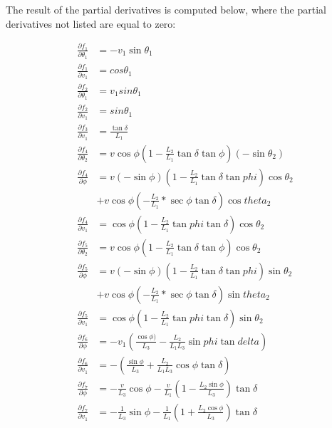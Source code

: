 The result of the partial derivatives is computed below, where the partial derivatives not listed are equal to zero:

\begin{equation}
\begin{aligned} 
    \frac{\partial f_1}{\partial \theta_1} &= -v_1 \sin{\theta_1} \\
    \frac{\partial f_1}{\partial v_1} &= cos\theta_1  \\
    \frac{\partial f_2}{\partial \theta_1} &= v_1 sin\theta_1  \\
    \frac{\partial f_2}{\partial v_1} &= sin\theta_1  \\
    \frac{\partial f_3}{\partial v_1} &= \frac{\tan{\delta}}{L_1}  \\
    \frac{\partial f_4}{\partial \theta_2} &= v\cos\phi(1-\frac{L_2}{L_1}\tan\delta\tan\phi)(-\sin{\theta_2})  \\
    \frac{\partial f_4}{\partial \phi} &= v (-\sin{\phi}) (1-\frac{L_2}{L_1}\tan{\delta}\tan{phi})\cos{\theta_2}\\
            &+v\cos{\phi}(-\frac{L_2}{L_1}*\sec{\phi} \tan{\delta})\cos{theta_2}  \\
    \frac{\partial f_4}{\partial v_1} &= \cos{\phi}(1 - \frac{L_2}{L_1}\tan{phi}\tan{\delta})\cos{\theta_2}  \\
    \frac{\partial f_5}{\partial \theta_2} &= v\cos\phi(1-\frac{L_2}{L_1}\tan\delta\tan\phi)\cos{\theta_2}  \\
    \frac{\partial f_5}{\partial \phi} &= v (-\sin{\phi}) (1-\frac{L_2}{L_1}\tan{\delta}\tan{phi})\sin{\theta_2}\\
            &+v\cos{\phi}(-\frac{L_2}{L_1}*\sec{\phi} \tan{\delta})\sin{theta_2}  \\
    \frac{\partial f_5}{\partial v_1} &= \cos{\phi}(1 - \frac{L_2}{L_1}\tan{phi}\tan{\delta})\sin{\theta_2}  \\
    \frac{\partial f_6}{\partial \phi} &= -v_1 (\frac{\cos{\phi})}{L_3} -\frac{L_2}{L_1 L_3} \sin{phi} \tan{delta})  \\
    \frac{\partial f_6}{\partial v_1} &= -(\frac{\sin{\phi}}{L_3} + \frac{L_2}{L_1 L_3}\cos{\phi}\tan{\delta} )  \\
    \frac{\partial f_7}{\partial \phi} &= -\frac{v}{L_3}\cos{\phi} - \frac{v}{L_1} ( 1 - \frac{L_2 \sin{\phi}}{L_3}) \tan{\delta}  \\
    \frac{\partial f_7}{\partial v_1} &= -\frac{1}{L_3}\sin{\phi} - \frac{1}{L_1} ( 1 + \frac{L_2 \cos{\phi}}{L_3}) \tan{\delta}  
\end{aligned}   
\end{equation}


